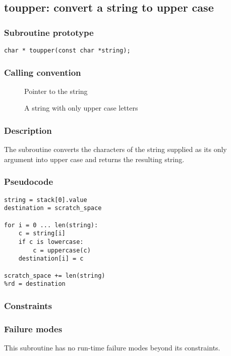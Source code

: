 \clearpage
{}
{}
\label{subr:toupper}
\subsection*{toupper: convert a string to upper case}

\subsubsection*{Subroutine prototype}

\begin{verbatim}
char * toupper(const char *string);
\end{verbatim}

\subsubsection*{Calling convention}

\begin{description}
\item[] Pointer to the string
\item[] A string with only upper case letters
\end{description}

\subsubsection*{Description}

The  subroutine converts the characters of the
string supplied as its only argument into upper case and returns the
resulting string.

\subsubsection*{Pseudocode}

\begin{verbatim}
string = stack[0].value
destination = scratch_space

for i = 0 ... len(string):
    c = string[i]
    if c is lowercase:
        c = uppercase(c)
    destination[i] = c

scratch_space += len(string)
%rd = destination
\end{verbatim}

\subsubsection*{Constraints}

\subsubsection*{Failure modes}

This subroutine has no run-time failure modes beyond its constraints.
